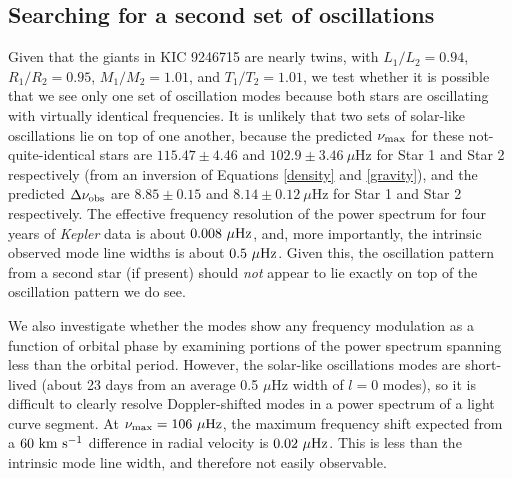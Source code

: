 \subsection{Searching for a second set of oscillations}\label{search}

Given that the giants in KIC 9246715 are nearly twins, with $L_1/L_2 = 0.94$, $R_1/R_2 = 0.95$, $M_1/M_2 = 1.01$, and $T_1/T_2 = 1.01$, we test whether it is possible that we see only one set of oscillation modes because both stars are oscillating with virtually identical frequencies. It is unlikely that two sets of solar-like oscillations lie on top of one another, because the predicted $\nu_{\rm{max}}$ for these not-quite-identical stars are $115.47 \pm 4.46$ and $102.9 \pm 3.46\ \mu$Hz for Star 1 and Star 2 respectively (from an inversion of Equations \ref{density} and \ref{gravity}), and the predicted $\Delta\nu_{\rm{obs}}$ are $8.85 \pm 0.15$ and $8.14 \pm 0.12 \ \mu$Hz for Star 1 and Star 2 respectively. The effective frequency resolution of the power spectrum for four years of \emph{Kepler} data is about $0.008 \ \mu \rm{Hz}$, and, more importantly, the intrinsic observed mode line widths is about $0.5 \ \mu \rm{Hz}$. Given this, the oscillation pattern from a second star (if present) should \emph{not} appear to lie exactly on top of the oscillation pattern we do see. 

We also investigate whether the modes show any frequency modulation as a function of orbital phase by examining portions of the power spectrum spanning less than the orbital period. However, the solar-like oscillations modes are short-lived (about 23 days from an average 0.5 $\mu$Hz width of $l=0$ modes), so it is difficult to clearly resolve Doppler-shifted modes in a power spectrum of a light curve segment. At $\nu_{\rm{max}} = 106 \ \mu \rm{Hz}$, the maximum frequency shift expected from a $60 \ \rm{km} \ \rm{s}^{-1}$ difference in radial velocity is $0.02 \ \mu \rm{Hz}$. This is less than the intrinsic mode line width, and therefore not easily observable.